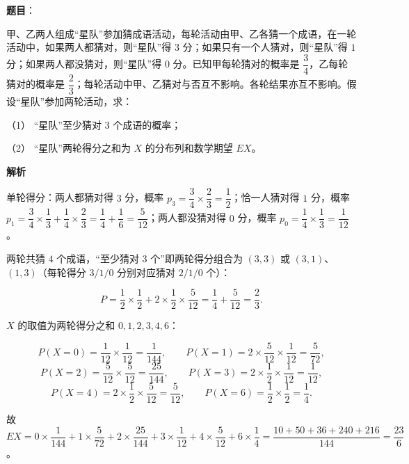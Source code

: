 \begin{answer}

\textbf{题目}：

甲、乙两人组成“星队”参加猜成语活动，每轮活动由甲、乙各猜一个成语，在一轮活动中，如果两人都猜对，则“星队”得 \(3\) 分；如果只有一个人猜对，则“星队”得 \(1\) 分；如果两人都没猜对，则“星队”得 \(0\) 分。已知甲每轮猜对的概率是 \(\dfrac{3}{4}\)，乙每轮猜对的概率是 \(\dfrac{2}{3}\)；每轮活动中甲、乙猜对与否互不影响。各轮结果亦互不影响。假设“星队”参加两轮活动，求：

（1） “星队”至少猜对 \(3\) 个成语的概率；

（2） “星队”两轮得分之和为 \(X\) 的分布列和数学期望 \(EX\)。

\textbf{解析}

单轮得分：两人都猜对得 \(3\) 分，概率 \(p_{3}=\dfrac{3}{4}\times\dfrac{2}{3}=\dfrac{1}{2}\)；恰一人猜对得 \(1\) 分，概率 \(p_{1}=\dfrac{3}{4}\times\dfrac{1}{3}+\dfrac{1}{4}\times\dfrac{2}{3}=\dfrac{1}{4}+\dfrac{1}{6}=\dfrac{5}{12}\)；两人都没猜对得 \(0\) 分，概率 \(p_{0}=\dfrac{1}{4}\times\dfrac{1}{3}=\dfrac{1}{12}\)。


两轮共猜 \(4\) 个成语，“至少猜对 \(3\) 个”即两轮得分组合为 \((3,3)\) 或 \((3,1)\)、\((1,3)\)（每轮得分 \(3/1/0\) 分别对应猜对 \(2/1/0\) 个）：

\nopagebreak[4]
\[
P=\dfrac{1}{2}\times\dfrac{1}{2}+2\times\dfrac{1}{2}\times\dfrac{5}{12}=\dfrac{1}{4}+\dfrac{5}{12}=\dfrac{2}{3}.
\]


\(X\) 的取值为两轮得分之和 \(0,1,2,3,4,6\)：

\nopagebreak[4]
\[
P(X=0)=\dfrac{1}{12}\times\dfrac{1}{12}=\dfrac{1}{144},\qquad P(X=1)=2\times\dfrac{5}{12}\times\dfrac{1}{12}=\dfrac{5}{72},
\]
\nopagebreak[4]
\[
P(X=2)=\dfrac{5}{12}\times\dfrac{5}{12}=\dfrac{25}{144},\qquad P(X=3)=2\times\dfrac{1}{2}\times\dfrac{1}{12}=\dfrac{1}{12},
\]
\nopagebreak[4]
\[
P(X=4)=2\times\dfrac{1}{2}\times\dfrac{5}{12}=\dfrac{5}{12},\qquad P(X=6)=\dfrac{1}{2}\times\dfrac{1}{2}=\dfrac{1}{4}.
\]

故 \(EX=0\times\dfrac{1}{144}+1\times\dfrac{5}{72}+2\times\dfrac{25}{144}+3\times\dfrac{1}{12}+4\times\dfrac{5}{12}+6\times\dfrac{1}{4}=\dfrac{10+50+36+240+216}{144}=\dfrac{23}{6}\)。



\end{answer}
